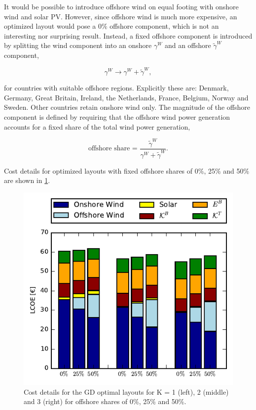 \documentclass[a4paper, 5p, sort&compress]{elsarticle}%
\begin{document}
It would be possible to introduce offshore wind on equal footing with
onshore wind and solar PV. However, since offshore wind is much more
expensive, an optimized layout would pose a 0\% offshore component,
which is not an interesting nor surprising result. Instead, a fixed
offshore component is introduced by splitting the wind component into
an onshore $\gamma^{W}$ and an offshore $\tilde{\gamma}^{W}$ component,

\begin{equation}
  \label{eq:11}
  \gamma^{W} \to \gamma^{W} + \tilde{\gamma}^{W}, 
\end{equation}

for countries with suitable offshore regions. Explicitly these are:
Denmark, Germany, Great Britain, Ireland, the Netherlands, France,
Belgium, Norway and Sweden. Other countries retain onshore wind
only. The magnitude of the offshore component is defined by requiring
that the offshore wind power generation accounts for a fixed share of
the total wind power generation,

\begin{equation}
  \label{eq:12}
  \text{offshore share = }\frac{\tilde{\gamma}^W}{\gamma^{W} + \tilde{\gamma}^W}.
\end{equation}

Cost details for optimized layouts with fixed offshore shares of 0\%, 25\% and
50\% are shown in \cref{fig:cost-offshore}.

\begin{figure}[h!]
  \centering
  \includegraphics[width = \columnwidth]{costOffshoreVE50}
  \caption{Cost details for the GD optimal layouts for K = 1 (left),
    2 (middle) and 3 (right) for offshore shares of 0\%, 25\% and 50\%.}
  \label{fig:cost-offshore}
\end{figure}
\end{document}
